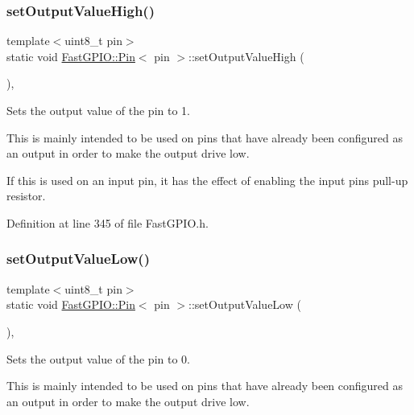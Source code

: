 \subsubsection{\texorpdfstring{set\+Output\+Value\+High()}{setOutputValueHigh()}}
{\footnotesize\ttfamily template$<$uint8\+\_\+t pin$>$ \\
static void \hyperlink{class_fast_g_p_i_o_1_1_pin}{Fast\+G\+P\+I\+O\+::\+Pin}$<$ pin $>$\+::set\+Output\+Value\+High (\begin{DoxyParamCaption}{ }\end{DoxyParamCaption})\hspace{0.3cm}{\ttfamily [inline]}, {\ttfamily [static]}}



Sets the output value of the pin to 1. 

This is mainly intended to be used on pins that have already been configured as an output in order to make the output drive low.

If this is used on an input pin, it has the effect of enabling the input pin\textquotesingle{}s pull-\/up resistor. 

Definition at line 345 of file Fast\+G\+P\+I\+O.\+h.

\mbox{\label{class_fast_g_p_i_o_1_1_pin_acff357765bbc7c56564a871d1bdd4868}} 
\subsubsection{\texorpdfstring{set\+Output\+Value\+Low()}{setOutputValueLow()}}
{\footnotesize\ttfamily template$<$uint8\+\_\+t pin$>$ \\
static void \hyperlink{class_fast_g_p_i_o_1_1_pin}{Fast\+G\+P\+I\+O\+::\+Pin}$<$ pin $>$\+::set\+Output\+Value\+Low (\begin{DoxyParamCaption}{ }\end{DoxyParamCaption})\hspace{0.3cm}{\ttfamily [inline]}, {\ttfamily [static]}}



Sets the output value of the pin to 0. 

This is mainly intended to be used on pins that have already been configured as an output in order to make the output drive low.

